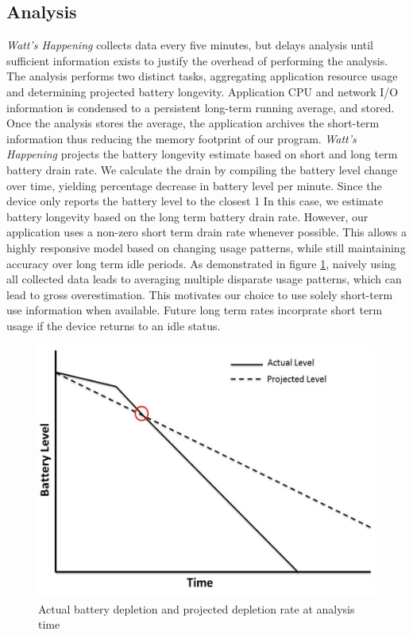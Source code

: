 \subsection{Analysis}
\label{subsec:impl_analysis}
\emph{Watt's Happening} collects data every five minutes, but delays analysis until sufficient information exists to justify the overhead of performing the analysis.
The analysis performs two distinct tasks, aggregating application resource usage and determining projected battery longevity.
Application CPU and network I/O information is condensed to a persistent long-term running average, and stored.
Once the analysis stores the average, the application archives the short-term information thus reducing the memory footprint of our program.
\emph{Watt's Happening} projects the battery longevity estimate based on short and long term battery drain rate.
We calculate the drain by compiling the battery level change over time, yielding  percentage decrease in battery level per minute. 
Since the device only reports the battery level to the closest 1%
In this case, we estimate battery longevity based on the long term battery drain rate.
However, our application uses a non-zero short term drain rate whenever possible.
This allows a highly responsive model based on changing usage patterns, while still maintaining accuracy over long term idle periods.
As demonstrated in figure \ref{fig:bat_v_time}, naively using all collected data leads to averaging multiple disparate usage patterns, which can lead to gross overestimation.  
This motivates our choice to use solely short-term use information when available.
Future long term rates incorprate short term usage if the device returns to an idle status.
\begin{figure}[ht!]
	\begin{center}
		\includegraphics[width=\columnwidth]{figs/bat_vs_time.png}
		\caption{Actual battery depletion and projected depletion rate at analysis time}
		\label{fig:bat_v_time}
\end{center}
\end{figure}
